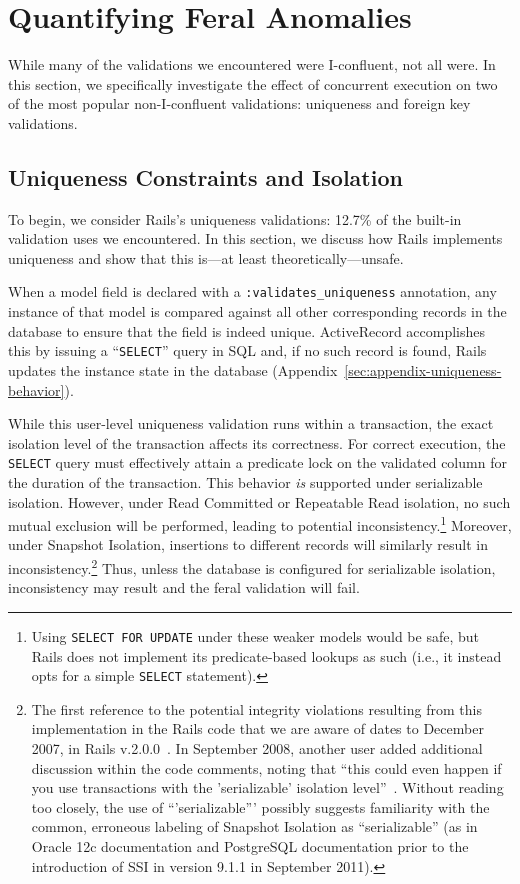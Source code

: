 
\section{Quantifying Feral Anomalies}
\label{sec:evaluation}

While many of the validations we encountered were I-confluent,
not all were. In this section, we specifically investigate the effect
of concurrent execution on two of the most popular non-I-confluent
validations: uniqueness and foreign key validations.

\subsection{Uniqueness Constraints and Isolation}

To begin, we consider Rails's uniqueness validations: 12.7\% of the
built-in validation uses we encountered. In this section, we discuss
how Rails implements uniqueness and show that this is---at least
theoretically---unsafe.

When a model field is declared with a \texttt{:validates\_uniqueness}
annotation, any instance of that model is compared against all other
corresponding records in the database to ensure that the field is
indeed unique. ActiveRecord accomplishes this by issuing a
``\texttt{SELECT}'' query in SQL and, if no such record is found,
Rails updates the instance state in the database
(Appendix~\ref{sec:appendix-uniqueness-behavior}).

While this user-level uniqueness validation runs within a transaction,
the exact isolation level of the transaction affects its
correctness. For correct execution, the \texttt{SELECT} query must
effectively attain a predicate lock on the validated column for the
duration of the transaction. This behavior \textit{is} supported under
serializable isolation. However, under Read Committed or Repeatable
Read isolation, no such mutual exclusion will be performed, leading to
potential inconsistency.\footnote{Using \texttt{SELECT FOR UPDATE}
  under these weaker models would be safe, but Rails does not
  implement its predicate-based lookups as such (i.e., it instead opts
  for a simple \texttt{SELECT} statement).}  Moreover, under Snapshot Isolation,
insertions to different records will similarly result in
inconsistency.\footnote{The first reference to the potential integrity
  violations resulting from this implementation in the Rails code that
  we are aware of dates to December 2007, in Rails
  v.2.0.0~\cite{code-unique-race-one}.  In September 2008, another
  user added additional discussion within the code comments, noting
  that ``this could even happen if you use transactions with the
  'serializable' isolation
  level''~\cite{code-unique-race-two}. Without reading too closely,
  the use of ``'serializable''' possibly suggests familiarity with the
  common, erroneous labeling of Snapshot Isolation as ``serializable''
  (as in Oracle 12c documentation and PostgreSQL documentation prior
  to the introduction of SSI in version 9.1.1 in September
  2011)\label{fn:si-rails}. } Thus, unless the database is configured
for serializable isolation, inconsistency may result and the feral
validation will fail.

